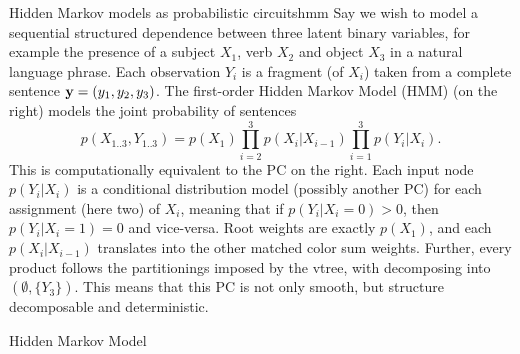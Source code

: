 \begin{example}[sidebyside,lefthand width=0.55\textwidth]{Hidden Markov models as probabilistic circuits}{hmm}
  Say we wish to model a sequential structured dependence between three latent binary variables, for
  example the presence of a subject $X_1$, verb $X_2$ and object $X_3$ in a natural language
  phrase. Each observation $Y_i$ is a fragment (of $X_i$) taken from a complete sentence
  $\mathbf{y}=(y_1,y_2,y_3)$. The first-order Hidden Markov Model (HMM) (on the right) models the
  joint probability of sentences
  \begin{equation}
    p(X_{1..3},Y_{1..3})=p(X_1)\prod_{i=2}^3 p(X_i|X_{i-1})\prod_{i=1}^3 p(Y_i|X_i).
  \end{equation}
  This is computationally equivalent to the PC on the right. Each input node $p(Y_i|X_i)$ is a
  conditional distribution model (possibly another PC) for each assignment (here two) of $X_i$,
  meaning that if $p(Y_i|X_i=0)>0$, then $p(Y_i|X_i=1)=0$ and vice-versa. Root weights are exactly
  $p(X_1)$, and each $p(X_i|X_{i-1})$ translates into the other matched color sum weights. Further,
  every product follows the partitionings imposed by the vtree, with
  \inode[fill=boxgray!80]{\newProdNode} decomposing into $(\emptyset,\{Y_3\})$. This means that
  this PC is not only smooth, but structure decomposable and deterministic.
  \tcblower
  \begin{center}

    \vskip -0.25cm
    \small%
    Hidden Markov Model


\end{center}
\end{example}
